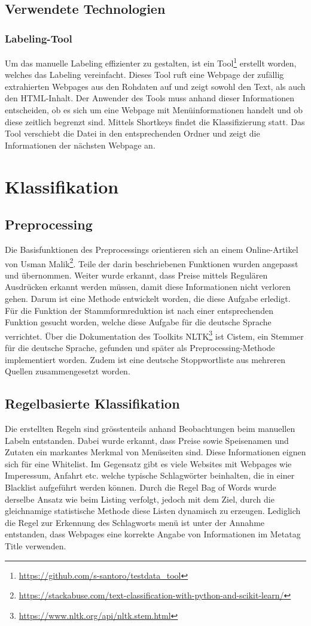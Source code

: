 \subsection{Verwendete Technologien}
\subsubsection{Labeling-Tool}
Um das manuelle Labeling effizienter zu gestalten, ist ein Tool\footnote{\url{https://github.com/s-santoro/testdata_tool}} erstellt worden, welches das Labeling vereinfacht.
Dieses Tool ruft eine Webpage der zufällig extrahierten Webpages aus den Rohdaten auf und zeigt sowohl den Text, als auch den HTML-Inhalt.
Der Anwender des Tools muss anhand dieser Informationen entscheiden, ob es sich um eine Webpage mit Menüinformationen handelt und ob diese zeitlich begrenzt sind.
Mittels Shortkeys findet die Klassifizierung statt.
Das Tool verschiebt die Datei in den entsprechenden Ordner und zeigt die Informationen der nächsten Webpage an.
\section{Klassifikation}
\subsection{Preprocessing}
Die Basisfunktionen des Preprocessings orientieren sich an einem Online-Artikel von Usman Malik\footnote{\url{https://stackabuse.com/text-classification-with-python-and-scikit-learn/}}.
Teile der darin beschriebenen Funktionen wurden angepasst und übernommen.
Weiter wurde erkannt, dass Preise mittels Regulären Ausdrücken erkannt werden müssen, damit diese Informationen nicht verloren gehen.
Darum ist eine Methode entwickelt worden, die diese Aufgabe erledigt.
Für die Funktion der Stammformreduktion ist nach einer entsprechenden Funktion gesucht worden, welche diese Aufgabe für die deutsche Sprache verrichtet.
Über die Dokumentation des Toolkits NLTK\footnote{\url{https://www.nltk.org/api/nltk.stem.html}} ist Cistem, ein Stemmer für die deutsche Sprache, gefunden und später als Preprocessing-Methode implementiert worden.
Zudem ist eine deutsche Stoppwortliste aus mehreren Quellen zusammengesetzt worden.
\subsection{Regelbasierte Klassifikation}
Die erstellten Regeln sind grösstenteils anhand Beobachtungen beim manuellen Labeln entstanden.
Dabei wurde erkannt, dass Preise sowie Speisenamen und Zutaten ein markantes Merkmal von Menüseiten sind.
Diese Informationen eignen sich für eine Whitelist.
Im Gegensatz gibt es viele Websites mit Webpages wie \glqq Imperessum\grqq{}, \glqq Anfahrt\grqq{} etc. welche typische Schlagwörter beinhalten, die in einer Blacklist aufgeführt werden können.
Durch die Regel \glqq Bag of Words\grqq{} wurde derselbe Ansatz wie beim Listing verfolgt, jedoch mit dem Ziel, durch die gleichnamige statistische Methode diese Listen dynamisch zu erzeugen.
Lediglich die Regel zur Erkennung des Schlagworts \glqq menü\grqq{} ist unter der Annahme entstanden, dass Webpages eine korrekte Angabe von Informationen im Metatag \glqq Title\grqq{} verwenden.
